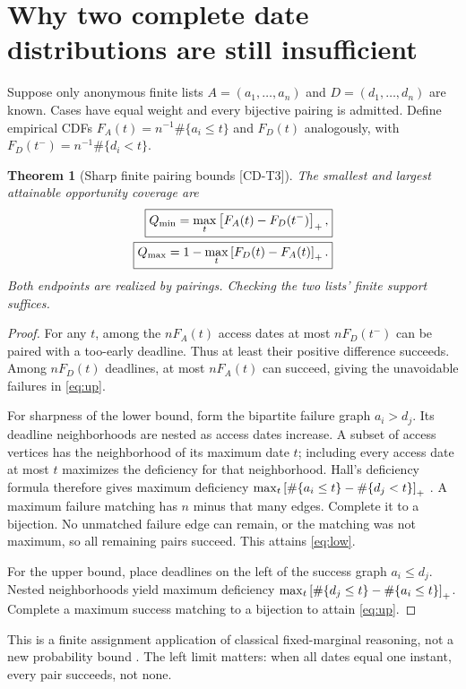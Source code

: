 \documentclass[11pt,a4paper]{article}
\newtheorem{theorem}{Theorem}
\theoremstyle{definition}\newtheorem{definition}{Definition}
\newcommand{\tagid}[1]{\textnormal{\textsf{[#1]}}}
\begin{document}
\section{Why two complete date distributions are still insufficient}
\label{sec:identification}
Suppose only anonymous finite lists $A=(a_1,\ldots,a_n)$ and $D=(d_1,\ldots,d_n)$ are known. Cases have equal weight and every bijective pairing is admitted. Define empirical CDFs $F_A(t)=n^{-1}\#\{a_i\le t\}$ and $F_D(t)$ analogously, with $F_D(t^-)=n^{-1}\#\{d_i<t\}$.

\begin{theorem}[Sharp finite pairing bounds \tagid{CD-T3}]
\label{thm:pairing}
The smallest and largest attainable opportunity coverage are
\begin{align}
\boxed{Q_{\min}=\max_t\left[F_A(t)-F_D(t^-)\right]_+,}\label{eq:low}\\
\boxed{Q_{\max}=1-\max_t\left[F_D(t)-F_A(t)\right]_+.}\label{eq:up}
\end{align}
Both endpoints are realized by pairings. Checking the two lists' finite support suffices.
\end{theorem}
\begin{proof}
For any $t$, among the $nF_A(t)$ access dates at most $nF_D(t^-)$ can be paired with a too-early deadline. Thus at least their positive difference succeeds. Among $nF_D(t)$ deadlines, at most $nF_A(t)$ can succeed, giving the unavoidable failures in \cref{eq:up}.

For sharpness of the lower bound, form the bipartite failure graph $a_i>d_j$. Its deadline neighborhoods are nested as access dates increase. A subset of access vertices has the neighborhood of its maximum date $t$; including every access date at most $t$ maximizes the deficiency for that neighborhood. Hall's deficiency formula therefore gives maximum deficiency $\max_t\left[\#\{a_i\le t\}-\#\{d_j<t\}\right]_+$ \cite{hall}. A maximum failure matching has $n$ minus that many edges. Complete it to a bijection. No unmatched failure edge can remain, or the matching was not maximum, so all remaining pairs succeed. This attains \cref{eq:low}.

For the upper bound, place deadlines on the left of the success graph $a_i\le d_j$. Nested neighborhoods yield maximum deficiency $\max_t\left[\#\{d_j\le t\}-\#\{a_i\le t\}\right]_+$. Complete a maximum success matching to a bijection to attain \cref{eq:up}.
\end{proof}
This is a finite assignment application of classical fixed-marginal reasoning, not a new probability bound \cite{makarov}. The left limit matters: when all dates equal one instant, every pair succeeds, not none.
\end{document}
